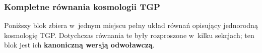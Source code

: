\subsubsection{Kompletne r\'ownania kosmologii TGP}\label{sssec:cosmo-complete}

\begin{remark}\label{rem:cosmo-complete-status}
Poni\.zszy blok zbiera w~jednym miejscu pe\l{}ny uk\l{}ad r\'owna\'n
opisuj\k{a}cy jednorodn\k{a} kosmologi\k{e} TGP.
Dotychczas r\'ownania te by\l{}y rozproszone w~kilku sekcjach;
ten blok jest ich \textbf{kanoniczn\k{a} wersj\k{a} odwo\l{}awcz\k{a}}.
\end{remark}


